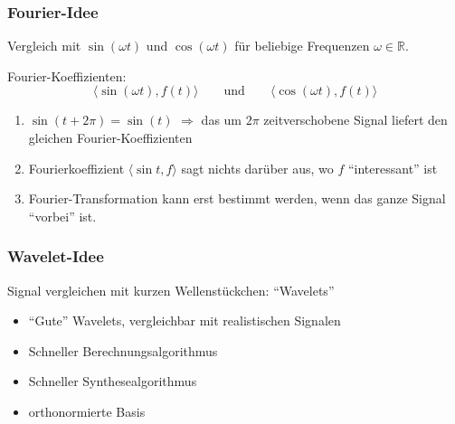 %
%
\begin{frame}
\frametitle{Fourier-Idee}
\begin{idee}
Vergleich mit $\sin(\omega t)$ und $\cos(\omega t)$ für beliebige Frequenzen
$\omega\in\mathbb R$.
\end{idee}
\bigskip

Fourier-Koeffizienten:
\[
\langle \sin(\omega t), f(t) \rangle
\qquad\text{und}\qquad
\langle \cos(\omega t), f(t) \rangle
\]

\bigskip

\begin{nachteile}
\begin{enumerate}[<+->]
\item
$\sin(t + 2\pi) = \sin(t)$
$\Rightarrow$ 
das um $2\pi$ zeitverschobene Signal liefert den gleichen
Fourier-Koeffizienten
\item
Fourierkoeffizient $\langle \sin t, f\rangle$ sagt nichts darüber aus, wo
$f$ ``interessant'' ist
\item
Fourier-Transformation kann erst bestimmt werden, wenn das ganze Signal
``vorbei'' ist.
\end{enumerate}
\end{nachteile}
\end{frame}

%
%
\begin{frame}
\frametitle{Wavelet-Idee}
\begin{idee}
Signal vergleichen mit kurzen Wellenstückchen: ``Wavelets''
\end{idee}
\pause
\begin{faktoren}
\begin{itemize}[<+->]
\item 
``Gute'' Wavelets, vergleichbar mit realistischen Signalen
\item 
Schneller Berechnungsalgorithmus
\item 
Schneller Synthesealgorithmus
\item 
orthonormierte Basis
\end{itemize}
\end{faktoren}
\end{frame}

